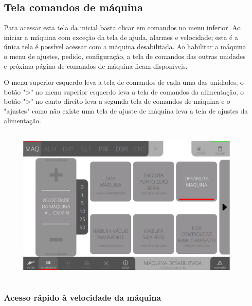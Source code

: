 \thispagestyle{fancy}

\vspace*{\fill}

\subsection{Tela comandos de máquina}

Para acessar esta tela da inicial basta clicar em comandos no menu inferior. Ao iniciar a máquina com exceção da tela de ajuda, alarmes e velocidade; esta é a única tela é possível acessar com a máquina desabilitada. Ao habilitar a máquina o menu de ajustes, pedido, configuração, a tela de comandos das outras unidades e próxima página de comandos de máquina ficam disponíveis.

O menu superior esquerdo leva a tela de comandos de cada uma das unidades, o botão "\textgreater" no menu superior esquerdo leva a tela de comandos da alimentação, o botão "\textgreater" no canto direito leva a segunda tela de comandos de máquina e o "ajustes" como não existe uma tela de ajuste de máquina leva a tela de ajustes da alimentação.

\vspace*{10pt}

\begin{figure}[h]
  \centering
  \includegraphics[width=480px,height=300px]{src/imagesFlexo/02-machine/e-Tela-Principal.png}
\end{figure}

\vspace*{\fill}

\newpage
\thispagestyle{fancy}

\vspace*{\fill}

\subsubsection{\small{Acesso rápido à velocidade da máquina}}

